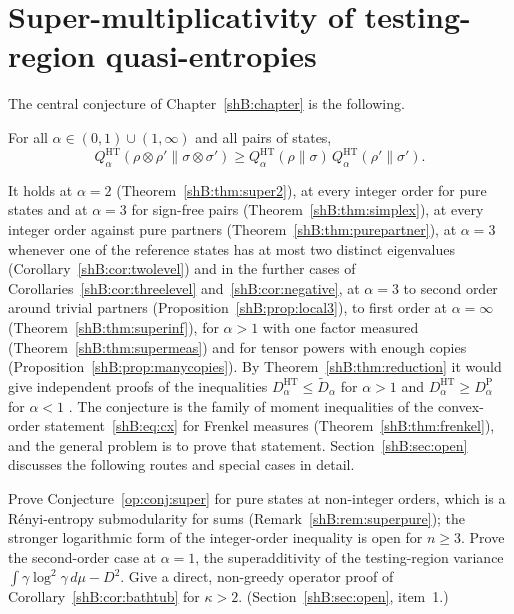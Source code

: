 \section{Super-multiplicativity of testing-region quasi-entropies}\label{op:sec:supermult}

The central conjecture of Chapter~\ref{shB:chapter} is the following.

\begin{conjecture}\label{op:conj:super}
For all $\alpha\in(0,1)\cup(1,\infty)$ and all pairs of states,
\[
Q^{\mathrm{HT}}_\alpha(\rho\otimes\rho'\|\sigma\otimes\sigma')\ge Q^{\mathrm{HT}}_\alpha(\rho\|\sigma)\,Q^{\mathrm{HT}}_\alpha(\rho'\|\sigma').
\]
\end{conjecture}

\noindent It holds at $\alpha=2$ (Theorem~\ref{shB:thm:super2}), at every integer order for pure states and at $\alpha=3$ for sign-free pairs (Theorem~\ref{shB:thm:simplex}), at every integer order against pure partners (Theorem~\ref{shB:thm:purepartner}), at $\alpha=3$ whenever one of the reference states has at most two distinct eigenvalues (Corollary~\ref{shB:cor:twolevel}) and in the further cases of Corollaries~\ref{shB:cor:threelevel} and~\ref{shB:cor:negative}, at $\alpha=3$ to second order around trivial partners (Proposition~\ref{shB:prop:local3}), to first order at $\alpha=\infty$ (Theorem~\ref{shB:thm:superinf}), for $\alpha>1$ with one factor measured (Theorem~\ref{shB:thm:supermeas}) and for tensor powers with enough copies (Proposition~\ref{shB:prop:manycopies}). By Theorem~\ref{shB:thm:reduction} it would give independent proofs of the inequalities $D^{\mathrm{HT}}_\alpha\le\widetilde D_\alpha$ for $\alpha>1$ \cite{LiuHircheCheng2025} and $D^{\mathrm{HT}}_\alpha\ge D^{\mathrm P}_\alpha$ for $\alpha<1$ \cite{BeigiHircheTomamichel2025}. The conjecture is the family of moment inequalities of the convex-order statement~\eqref{shB:eq:cx} for Frenkel measures (Theorem~\ref{shB:thm:frenkel}), and the general problem is to prove that statement. Section~\ref{shB:sec:open} discusses the following routes and special cases in detail.

\begin{problem}\label{op:prob:super special}
Prove Conjecture~\ref{op:conj:super} for pure states at non-integer orders, which is a R\'enyi-entropy submodularity for sums (Remark~\ref{shB:rem:superpure}); the stronger logarithmic form of the integer-order inequality is open for $n\ge3$. Prove the second-order case at $\alpha=1$, the superadditivity of the testing-region variance $\int\gamma\log^2\gamma\,d\mu-D^2$. Give a direct, non-greedy operator proof of Corollary~\ref{shB:cor:bathtub} for $\kappa>2$. (Section~\ref{shB:sec:open}, item~1.)
\end{problem}

